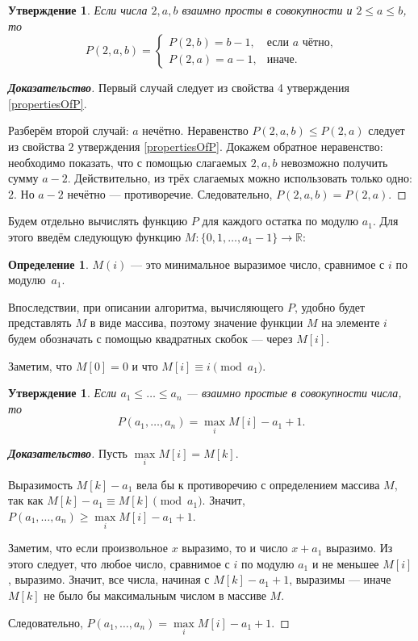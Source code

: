 \documentclass[12pt]{article}
\newtheorem{proposition}[theorem]{Утверждение}
\theoremstyle{definition}
\newtheorem{definition}[theorem]{Определение}
\begin{document}
\begin{proposition}
Если числа $2, a, b$ взаимно просты в совокупности и $2 \le a \le b$, то \begin{equation*}
P(2, a, b) = \begin{cases}
P(2, b) = b - 1, &\text{если $a$ чётно,} \\
P(2, a) = a - 1,&\text{иначе.}
\end{cases}
\end{equation*}

\end{proposition}
\begin{proof}[\textbf{Доказательство}]
Первый случай следует из свойства 4 утверждения \ref{propertiesOfP}.

Разберём второй случай: $a$ нечётно. Неравенство $P(2, a, b) \le P(2, a)$ следует из свойства $2$ утверждения \ref{propertiesOfP}. Докажем обратное неравенство: необходимо показать, что с помощью слагаемых $2, a, b$ невозможно получить сумму $a - 2$. Действительно, из трёх слагаемых можно использовать только одно: $2$. Но $a - 2$ нечётно --- противоречие. Следовательно, $P(2, a, b) = P(2, a)$.
\end{proof}

Будем отдельно вычислять функцию $P$ для каждого остатка по модулю $a_1$. Для этого введём следующую функцию $M : \{ 0, 1, \dots, a_1 - 1\} \rightarrow \mathbb{R}$:

\begin{definition}
$M(i)$ --- это минимальное выразимое число, сравнимое с $i$ по модулю~$a_1$.
\end{definition}

Впоследствии, при описании алгоритма, вычисляющего $P$, удобно будет представлять $M$ в виде массива, поэтому значение функции $M$ на элементе $i$ будем обозначать с помощью квадратных скобок --- через $M[i]$.

Заметим, что $M[0] = 0$ и что $M[i] \equiv i \pmod {a_1}$.

\begin{proposition}
\label{algorithm:lemma1}
Если $a_1 \le \dots \le a_n$ --- взаимно простые в совокупности числа, то \begin{equation*}
P(a_1, \dots, a_n) = \max\limits_{i} M[i] - a_1 + 1.
\end{equation*}
\end{proposition}
\begin{proof}[\textbf{Доказательство}]
Пусть $\max\limits_{i} M[i] = M[k]$.

Выразимость $M[k] - a_1$ вела бы к противоречию с определением массива $M$, так как $M[k] - a_1 \equiv M[k] \pmod {a_1}$. Значит, $P(a_1, \dots, a_n) \ge \max\limits_{i} M[i] - a_1 + 1$.

Заметим, что если произвольное $x$ выразимо, то и число $x + a_1$ выразимо. Из этого следует, что любое число, сравнимое с $i$ по модулю $a_1$ и не меньшее $M[i]$, выразимо. Значит, все числа, начиная с $M[k] - a_1 + 1$, выразимы --- иначе $M[k]$ не было бы максимальным числом в массиве $M$.

Следовательно, $P(a_1, \dots, a_n) = \max\limits_{i} M[i] - a_1 + 1$.
\end{proof}
\end{document}
